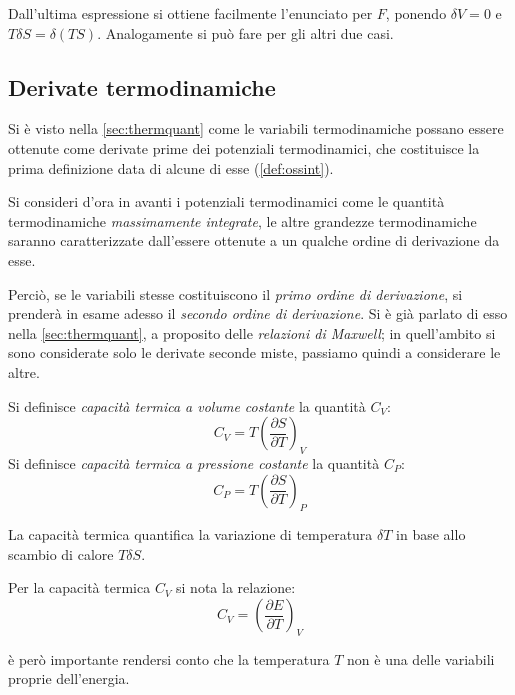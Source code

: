 Dall'ultima espressione si ottiene facilmente l'enunciato per $F$, ponendo $\delta V = 0$ e $T \delta S = \delta (T S)$. Analogamente si può fare per gli altri due casi.

\subsection{Derivate termodinamiche}

Si è visto nella \cref{sec:thermquant} come le variabili termodinamiche possano essere ottenute come derivate prime dei potenziali termodinamici, che costituisce la prima definizione data di alcune di esse (\cref{def:ossint}).

Si consideri d'ora in avanti i potenziali termodinamici come le quantità termodinamiche \textit{massimamente integrate}, le altre grandezze termodinamiche saranno caratterizzate dall'essere ottenute a un qualche ordine di derivazione da esse.

Perciò, se le variabili stesse costituiscono il \textit{primo ordine di derivazione}, si prenderà in esame adesso il \textit{secondo ordine di derivazione}. Si è già parlato di esso nella \cref{sec:thermquant}, a proposito delle \textit{relazioni di Maxwell}; in quell'ambito si sono considerate solo le derivate seconde miste, passiamo quindi a considerare le altre.

\begin{defn}
	Si definisce \textit{capacità termica a volume costante} la quantità $C_V$:
	\begin{equation*}
	C_V = T \left(\frac{\partial S}{\partial T}\right)_V
	\end{equation*}
	Si definisce \textit{capacità termica a pressione costante} la quantità $C_P$:
	\begin{equation*}
	C_P = T \left(\frac{\partial S}{\partial T}\right)_P
	\end{equation*}
\end{defn}

\noindent La capacità termica quantifica la variazione di temperatura $\delta T$ in base allo scambio di calore $T \delta S$.

Per la capacità termica $C_V$ si nota la relazione:
\begin{equation*}
C_V = \left(\frac{\partial E}{\partial T}\right)_V
\end{equation*}

\noindent è però importante rendersi conto che la temperatura $T$ non è una delle variabili proprie dell'energia.

